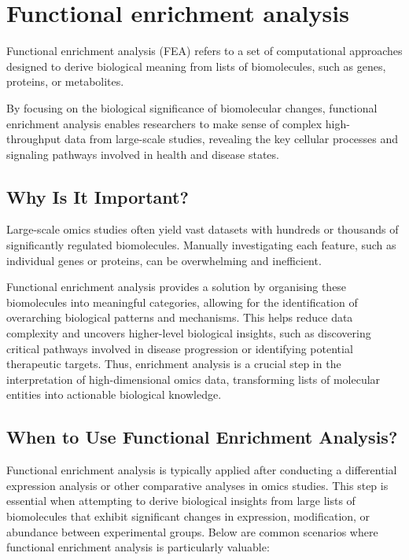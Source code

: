 \documentclass[
]{book}
\begin{document}
\hypertarget{functional-enrichment-analysis}{%
\section{Functional enrichment analysis}\label{functional-enrichment-analysis}}

Functional enrichment analysis (FEA) refers to a set of computational approaches designed to derive biological meaning from lists of biomolecules, such as genes, proteins, or metabolites.

By focusing on the biological significance of biomolecular changes, functional enrichment analysis enables researchers to make sense of complex high-throughput data from large-scale studies, revealing the key cellular processes and signaling pathways involved in health and disease states.

\hypertarget{why-is-it-important}{%
\subsection{Why Is It Important?}\label{why-is-it-important}}

Large-scale omics studies often yield vast datasets with hundreds or thousands of significantly regulated biomolecules. Manually investigating each feature, such as individual genes or proteins, can be overwhelming and inefficient.

Functional enrichment analysis provides a solution by organising these biomolecules into meaningful categories, allowing for the identification of overarching biological patterns and mechanisms. This helps reduce data complexity and uncovers higher-level biological insights, such as discovering critical pathways involved in disease progression or identifying potential therapeutic targets. Thus, enrichment analysis is a crucial step in the interpretation of high-dimensional omics data, transforming lists of molecular entities into actionable biological knowledge.

\hypertarget{when-to-use-functional-enrichment-analysis}{%
\subsection{When to Use Functional Enrichment Analysis?}\label{when-to-use-functional-enrichment-analysis}}

Functional enrichment analysis is typically applied after conducting a differential expression analysis or other comparative analyses in omics studies. This step is essential when attempting to derive biological insights from large lists of biomolecules that exhibit significant changes in expression, modification, or abundance between experimental groups. Below are common scenarios where functional enrichment analysis is particularly valuable:
\end{document}
